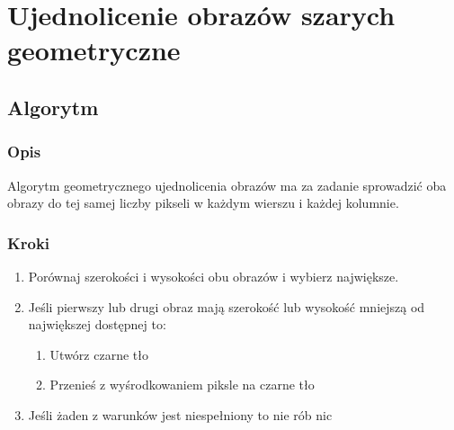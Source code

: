 \documentclass[a4paper,12pt]{book}
\begin{document}
\section{Ujednolicenie obrazów szarych geometryczne}
\subsection*{Algorytm}
\subsubsection*{Opis}
Algorytm geometrycznego ujednolicenia obrazów ma za zadanie sprowadzić oba obrazy do tej samej liczby pikseli w każdym wierszu i każdej kolumnie. 
\subsubsection*{Kroki}
\begin{enumerate}
	\item Porównaj szerokości i wysokości obu obrazów i wybierz największe. 
	\item Jeśli pierwszy lub drugi obraz mają szerokość lub wysokość mniejszą od największej dostępnej to:
	\begin{enumerate}
		\item Utwórz czarne tło
		\item Przenieś z wyśrodkowaniem piksle na czarne tło
	\end{enumerate}
	\item Jeśli żaden z warunków jest niespełniony to nie rób nic
\end{enumerate}
\end{document}
